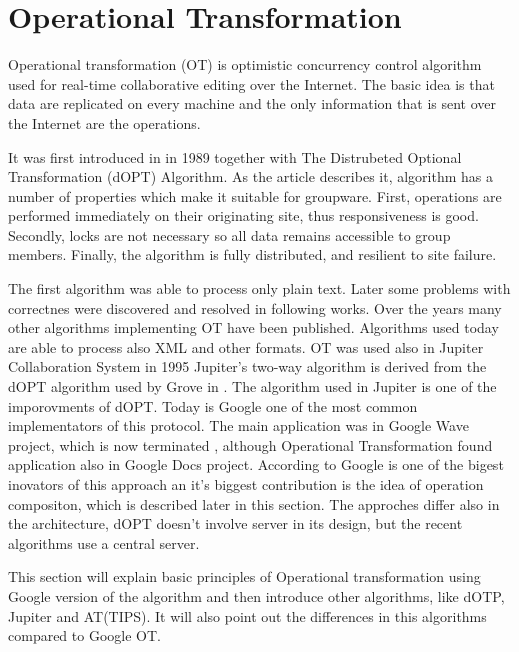 \documentclass[12pt,oneside,draft]{fithesis2}
\begin{document}
\section{Operational Transformation}
\par Operational transformation (OT) is optimistic concurrency control algorithm used for real-time collaborative editing over the Internet. The basic idea is that data are replicated on every machine and the only information that is sent over the Internet are the operations.
\par It was first introduced in \cite{Ellis} in 1989 together with The Distrubeted Optional Transformation (dOPT) Algorithm. As the article describes it, algorithm has a number of properties which make it suitable for groupware. First, operations are performed immediately on their originating site, thus responsiveness is good. Secondly, locks are not necessary so all data remains accessible to group members. Finally, the algorithm is fully distributed, and resilient to site failure.
\par The first algorithm was able to process only plain text. Later some problems with correctnes were discovered and resolved in following works. Over the years many other algorithms implementing OT have been published. Algorithms used today are able to process also XML and other formats. OT was used also in Jupiter Collaboration System in 1995 \cite{Jupiter} Jupiter's two-way algorithm is derived from the dOPT algorithm used by Grove in \cite{Ellis}. The algorithm used in Jupiter is one of the imporovments of dOPT. Today is Google one of the most common implementators of this protocol. The main application was in Google Wave project, which is now terminated , although Operational Transformation found application also in Google Docs project. According to \cite{Spiewak} Google is one of the bigest inovators of this approach an it's biggest contribution is the idea of operation compositon, which is described later in this section. The approches differ also in the architecture, dOPT doesn't involve server in its design, but the recent algorithms use a central server.
\par This section will explain basic principles of Operational transformation using Google version of the algorithm and then introduce other algorithms, like dOTP, Jupiter and AT(TIPS). It will also point out the differences in this algorithms compared to Google OT. 
\end{document}
